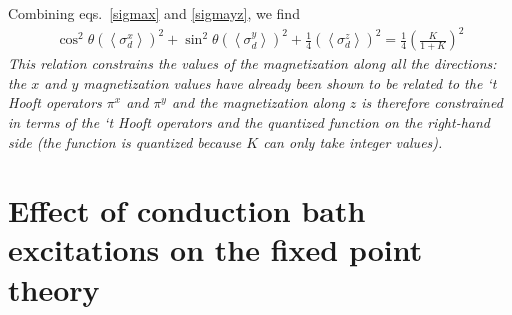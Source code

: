 \documentclass[reprint,prb,superscriptaddress]{revtex4-2}
\begin{document}
Combining eqs.~\ref{sigmax} and \ref{sigmayz}, we find
\begin{equation}\begin{aligned}
	\cos^2\theta\left(\left<\sigma^x_d\right>\right)^2 + \sin^2\theta\left(\left<\sigma^y_d\right>\right)^2 + \frac{1}{4}\left(\left<\sigma^z_d\right>\right)^2 = \frac{1}{4}\left(\frac{K}{1+K}\right)^2
\end{aligned}\end{equation}
\textit{This relation constrains the values of the magnetization along all the directions: the \(x\) and \(y\) magnetization values have already been shown to be related to the `t Hooft operators \(\pi^x\) and \(\pi^y\) and the magnetization along \(z\) is therefore constrained in terms of the `t Hooft operators and the quantized function on the right-hand side (the function is quantized because \(K\) can only take integer values).}






\section{Effect of conduction bath excitations on the fixed point theory}
\end{document}
